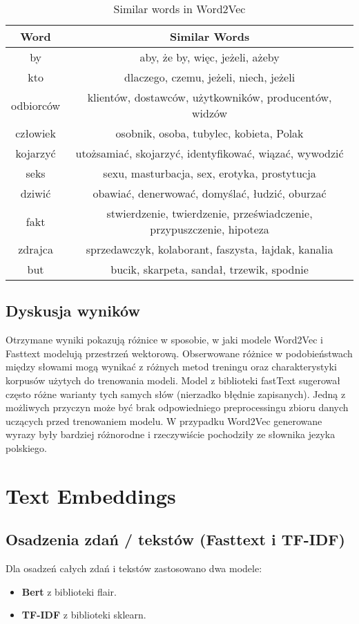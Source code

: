 \documentclass[12pt]{article}
\begin{document}
\begin{table}[h!]
\centering
\begin{tabular}{|c|c|}
\hline
\textbf{Word} & \textbf{Similar Words} \\
\hline
by & aby, że by, więc, jeżeli, ażeby \\
\hline
kto & dlaczego, czemu, jeżeli, niech, jeżeli \\
\hline
odbiorców & klientów, dostawców, użytkowników, producentów, widzów \\
\hline
człowiek & osobnik, osoba, tubylec, kobieta, Polak \\
\hline
kojarzyć & utożsamiać, skojarzyć, identyfikować, wiązać, wywodzić \\
\hline
seks & sexu, masturbacja, sex, erotyka, prostytucja \\
\hline
dziwić & obawiać, denerwować, domyślać, łudzić, oburzać \\
\hline
fakt & stwierdzenie, twierdzenie, przeświadczenie, przypuszczenie, hipoteza \\
\hline
zdrajca & sprzedawczyk, kolaborant, faszysta, łajdak, kanalia \\
\hline
but & bucik, skarpeta, sandał, trzewik, spodnie \\
\hline
\end{tabular}
\caption{Similar words in Word2Vec}
\end{table}

\subsection{Dyskusja wyników}
Otrzymane wyniki pokazują różnice w sposobie, w jaki modele Word2Vec i Fasttext modelują przestrzeń wektorową. Obserwowane różnice w podobieństwach między słowami mogą wynikać z różnych metod treningu oraz charakterystyki korpusów użytych do trenowania modeli. Model z biblioteki fastText sugerował często różne warianty tych samych słów (nierzadko błędnie zapisanych). Jedną z możliwych przyczyn może być brak odpowiedniego preprocessingu zbioru danych uczących przed trenowaniem modelu. W przypadku Word2Vec generowane wyrazy były bardziej różnorodne i rzeczywiście pochodziły ze słownika jezyka polskiego.

\section{Text Embeddings}

\subsection{Osadzenia zdań / tekstów (Fasttext i TF-IDF)}
Dla osadzeń całych zdań i tekstów zastosowano dwa modele:
\begin{itemize}
    \item \textbf{Bert} z biblioteki flair.
    \item \textbf{TF-IDF} z biblioteki sklearn.
\end{itemize}
\end{document}
